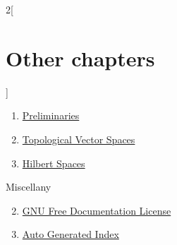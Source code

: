 \begin{multicols}{2}[\section{Other chapters}]
\noindent

\begin{enumerate}
\item \hyperref[preliminaries]{Preliminaries}
\item \hyperref[topological-vector-spaces-section-phantom]{Topological Vector Spaces}
\item \hyperref[hilbert-spaces-section-phantom]{Hilbert Spaces}

\end{enumerate}
Miscellany
\begin{enumerate}
\setcounter{enumi}{1}
\item \hyperref[fdl-section-phantom]{GNU Free Documentation License}
\item \hyperref[index-section-phantom]{Auto Generated Index}
\end{enumerate}
\end{multicols}
